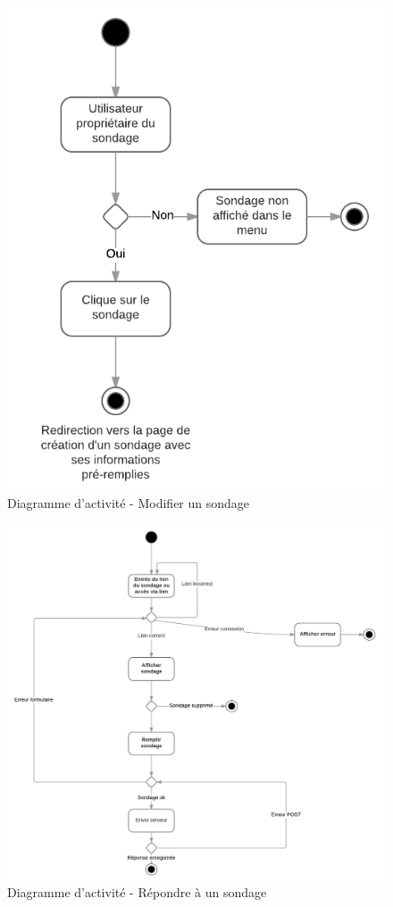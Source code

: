 \documentclass[titlepage]{report}
\begin{document}
\begin{figure}[h]
	\caption{Diagramme d'activité - Modifier un sondage}
	\label{annexe_diagramme_activite_modifierSondage}
	\centering
	\includegraphics[scale=0.7]{figures/diagrammes/activite_modifierSondage.png}
\end{figure}

\begin{figure}[h]
	\caption{Diagramme d'activité - Répondre à un sondage}
	\label{annexe_diagramme_activite_repondreSondage}
	\centering
	\includegraphics[scale=1]{figures/diagrammes/activite_repondreSondage.png}
\end{figure}
\end{document}
